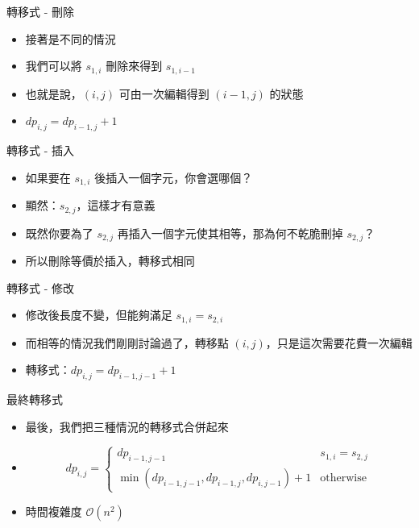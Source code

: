 \documentclass[aspectratio=169]{beamer}
\begin{document}
    \begin{frame}{轉移式 - 刪除}
        \begin{itemize}
            \item<1-> 接著是不同的情況
            \item<2-> 我們可以將 $s_{1, i}$ 刪除來得到 $s_{1, i - 1}$
            \item<2-> 也就是說，$(i, j)$ 可由一次編輯得到 $(i - 1, j)$ 的狀態
            \item<2-> $dp_{i, j} = dp_{i - 1, j} + 1$
        \end{itemize}
    \end{frame}

    \begin{frame}{轉移式 - 插入}
        \begin{itemize}
            \item<1-> 如果要在 $s_{1, i}$ 後插入一個字元，你會選哪個？
            \item<2-> 顯然：$s_{2, j}$，這樣才有意義
            \item<3-> 既然你要為了 $s_{2, j}$ 再插入一個字元使其相等，那為何不乾脆刪掉 $s_{2, j}$？
            \item<4-> 所以刪除等價於插入，轉移式相同
        \end{itemize}
    \end{frame}

    \begin{frame}{轉移式 - 修改}
        \begin{itemize}
            \item<1-> 修改後長度不變，但能夠滿足 $s_{1, i} = s_{2, i}$ 
            \item<2-> 而相等的情況我們剛剛討論過了，轉移點 $(i, j)$，只是這次需要花費一次編輯
            \item<3-> 轉移式：$dp_{i, j} = dp_{i - 1, j - 1} + 1$
        \end{itemize}
    \end{frame}

    \begin{frame}{最終轉移式}
        \begin{itemize}
            \item 最後，我們把三種情況的轉移式合併起來
            \item $$dp_{i, j} = \begin{cases}
            dp_{i - 1, j - 1} & s_{1, i} = s_{2, j} \\
            \min(dp_{i - 1, j - 1}, dp_{i - 1, j}, dp_{i, j - 1}) + 1 & \text{otherwise}
            \end{cases}$$
            \item 時間複雜度 $\mathcal{O}(n^2)$
        \end{itemize}
    \end{frame}
\end{document}
